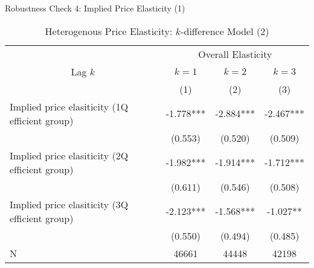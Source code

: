 \documentclass[
  ignorenonframetext,
]{beamer}
\begin{document}
\begin{frame}{Robustness Check 4: Implied Price Elasticity (1)}
\protect\hypertarget{robustness-check-4-implied-price-elasticity-1}{}
\begin{table}

\caption{\label{tab:kableHeterokDiffElasticitySlide2}Heterogenous Price Elasticity: $k$-difference Model (2)}
\centering
\fontsize{8}{10}\selectfont
\begin{tabular}[t]{lccc}
\toprule
\multicolumn{1}{c}{ } & \multicolumn{3}{c}{Overall Elasticity} \\
\cmidrule(l{3pt}r{3pt}){2-4}
\multicolumn{1}{c}{Lag $k$} & \multicolumn{1}{c}{$k = 1$} & \multicolumn{1}{c}{$k = 2$} & \multicolumn{1}{c}{$k = 3$} \\
\cmidrule(l{3pt}r{3pt}){1-1} \cmidrule(l{3pt}r{3pt}){2-2} \cmidrule(l{3pt}r{3pt}){3-3} \cmidrule(l{3pt}r{3pt}){4-4}
 & (1) & (2) & (3)\\
\midrule
Implied price elasiticity (1Q efficient group) & -1.778*** & -2.884*** & -2.467***\\
 & (0.553) & (0.520) & (0.509)\\
Implied price elasiticity (2Q efficient group) & -1.982*** & -1.914*** & -1.712***\\
 & (0.611) & (0.546) & (0.508)\\
Implied price elasiticity (3Q efficient group) & -2.123*** & -1.568*** & -1.027**\\
 & (0.550) & (0.494) & (0.485)\\
N & 46661 & 44448 & 42198\\
\bottomrule
\end{tabular}
\end{table}
\end{frame}
\end{document}
